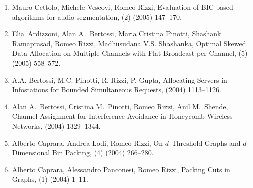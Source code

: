 \documentclass[11pt]{article}
\begin{document}
\begin{enumerate}
  \item {\sc Mauro Cettolo, Michele Vescovi, Romeo Rizzi},
   \newblock  Evaluation of BIC-based algorithms for audio segmentation,
   (2) (2005) 147--170.

  \item {\sc Elia~Ardizzoni, Alan A.~Bertossi, Maria Cristina Pinotti,
                  Shashank Ramaprasad,  Romeo Rizzi,  Madhusudana V.S. Shashanka},
   \newblock  Optimal Skewed Data Allocation on Multiple Channels with Flat
              Broadcast per Channel,
   (5) (2005) 558--572.

  \item {\sc A.A. Bertossi, M.C. Pinotti, R. Rizzi, P. Gupta}, %
   \newblock  Allocating Servers in Infostations for Bounded Simultaneous Requests,
    (2004) 1113--1126.

  \item {\sc Alan A.~Bertossi, Cristina M.~Pinotti, Romeo Rizzi, Anil M.~Shende},
   \newblock  Channel Assignment for Interference Avoidance in Honeycomb Wireless Networks,
    (2004) 1329--1344.

  \item {\sc Alberto Caprara, Andrea Lodi, Romeo Rizzi},
   \newblock  On $d$-Threshold Graphs and $d$-Dimensional Bin Packing,
   (4) (2004) 266--280.

  \item {\sc Alberto Caprara, Alessandro Panconesi, Romeo Rizzi},
   \newblock  Packing Cuts in Graphs,
   (1) (2004) 1--11.


\end{enumerate}
\end{document}
